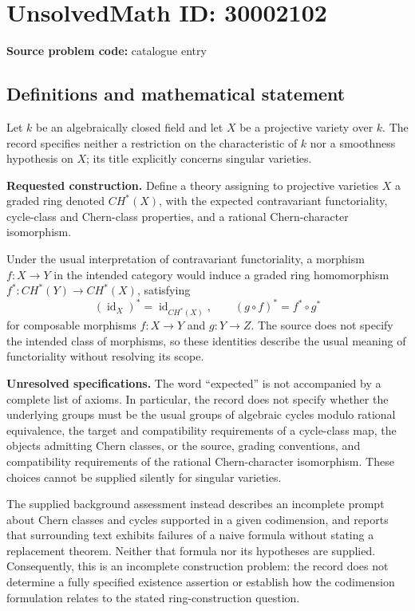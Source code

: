 \documentclass[11pt]{article}
\begin{document}
\section*{UnsolvedMath ID: 30002102}
\textbf{Source problem code:} catalogue entry
\subsection{Definitions and mathematical statement}
Let \(k\) be an algebraically closed field and let \(X\) be a projective variety over \(k\). The record specifies neither a restriction on the characteristic of \(k\) nor a smoothness hypothesis on \(X\); its title explicitly concerns singular varieties.

\textbf{Requested construction.} Define a theory assigning to projective varieties \(X\) a graded ring denoted \(CH^*(X)\), with the expected contravariant functoriality, cycle-class and Chern-class properties, and a rational Chern-character isomorphism.

Under the usual interpretation of contravariant functoriality, a morphism \(f\colon X\to Y\) in the intended category would induce a graded ring homomorphism \(f^*\colon CH^*(Y)\to CH^*(X)\), satisfying
\[
(\operatorname{id}_X)^*=\operatorname{id}_{CH^*(X)},\qquad
(g\circ f)^*=f^*\circ g^*
\]
for composable morphisms \(f\colon X\to Y\) and \(g\colon Y\to Z\). The source does not specify the intended class of morphisms, so these identities describe the usual meaning of functoriality without resolving its scope.

\textbf{Unresolved specifications.} The word ``expected'' is not accompanied by a complete list of axioms. In particular, the record does not specify whether the underlying groups must be the usual groups of algebraic cycles modulo rational equivalence, the target and compatibility requirements of a cycle-class map, the objects admitting Chern classes, or the source, grading conventions, and compatibility requirements of the rational Chern-character isomorphism. These choices cannot be supplied silently for singular varieties.

The supplied background assessment instead describes an incomplete prompt about Chern classes and cycles supported in a given codimension, and reports that surrounding text exhibits failures of a naive formula without stating a replacement theorem. Neither that formula nor its hypotheses are supplied. Consequently, this is an incomplete construction problem: the record does not determine a fully specified existence assertion or establish how the codimension formulation relates to the stated ring-construction question.
\end{document}

